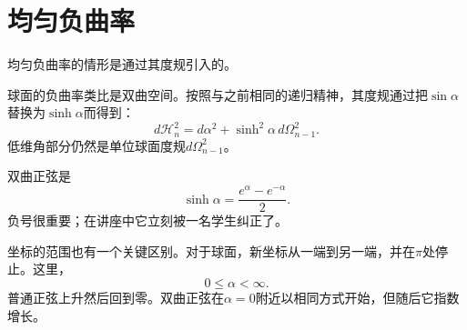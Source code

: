 \begin{classroomqa}
\end{classroomqa}

\begin{classroomqa}
\end{classroomqa}

\begin{classroomqa}
\end{classroomqa}

\section{均匀负曲率}

均匀负曲率的情形是通过其度规引入的。

球面的负曲率类比是双曲空间。按照与之前相同的递归精神，其度规通过把\(\sin\alpha\)替换为\(\sinh\alpha\)而得到：
\begin{equation}
d\mathcal H_n^2=d\alpha^2+\sinh^2\alpha\,d\Omega_{n-1}^2.
\end{equation}
低维角部分仍然是单位球面度规\(d\Omega_{n-1}^2\)。

\begin{classroomqa}
\end{classroomqa}

双曲正弦是
\begin{equation}
\sinh\alpha=\frac{e^\alpha-e^{-\alpha}}{2}.
\end{equation}
负号很重要；在讲座中它立刻被一名学生纠正了。

坐标的范围也有一个关键区别。对于球面，新坐标从一端到另一端，并在\(\pi\)处停止。这里，
\begin{equation}
0\leq \alpha<\infty.
\end{equation}
普通正弦上升然后回到零。双曲正弦在\(\alpha=0\)附近以相同方式开始，但随后它指数增长。

